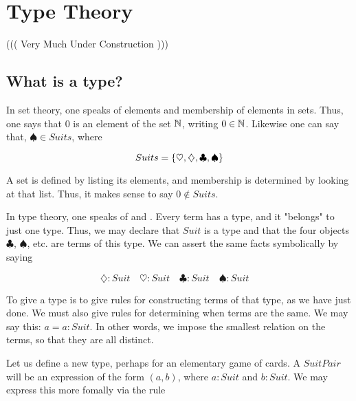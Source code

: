 


\begin{mathmacro}
\newcommand{\set}[1]{\{ #1 \}}
\newcommand{\nat}[0]{\mathbb{N}}
\end{mathmacro}

\section{Type Theory}

((( Very Much Under Construction )))

\innertableofcontents

\subsection{What is a type?}



In set theory, one speaks of elements and membership of elements in sets.  Thus, one says that $0$ is an element of the set $\nat$, writing $0 \in \nat$.  Likewise one can say that, $\spadesuit \in Suits$, where

$$ Suits = \set{\heartsuit, \diamondsuit, \clubsuit, \spadesuit }$$

A set is defined by listing its elements, and membership is determined by looking at that list.  Thus, it makes sense to say $0 \not\in Suits$.

In type theory, one speaks of  and .  Every term has a type, and it "belongs" to just one type.  Thus, we may declare that $Suit$ is a type and that the four objects $\clubsuit$, $\spadesuit$, etc. are terms of this type.  We can assert the same facts symbolically by saying

$$
\diamondsuit : Suit \quad
\heartsuit : Suit \quad
\clubsuit : Suit \quad
\spadesuit : Suit \quad
$$

To give a type is to give rules for constructing terms of that type, as we have just done.  We must also give rules for determining when terms are the same.  We may say this:  $a = a : Suit$.  In other words, we impose the smallest relation on the terms, so that they are all distinct.

Let us define a new type, perhaps for an elementary game of cards.  A $SuitPair$ will be an expression of the form $(a,b)$, where $a : Suit$ and $b : Suit$.  We may express this more fomally via the rule

